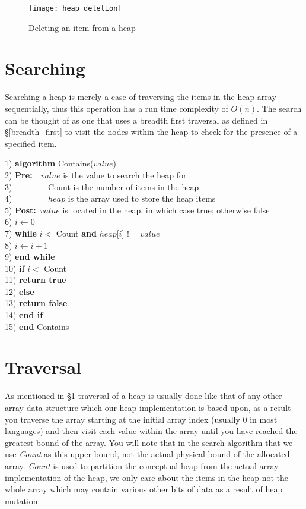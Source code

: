\begin{figure}
\begin{center}
\texttt{[image: heap\_deletion]}
\end{center}
\caption{Deleting an item from a heap} \label{fig:heap_deletion}
\end{figure}

\section{Searching} \label{heap_searching}
Searching a heap is merely a case of traversing the items in the heap array sequentially, thus this operation has a run time complexity of $O(n)$. The search can be thought of as one that uses a breadth first traversal as defined in \S\ref{breadth_first} to visit the nodes within the heap to check for the presence of a specified item.

\newpage
\begin{tabbing}
1)  \textbf{alg}\= \textbf{orithm} Contains($value$) \\
2)  \> \textbf{Pre:}~~$value$ is the value to search the heap for \\
3)  \> ~~~~~~~~Count is the number of items in the heap \\
4)  \> ~~~~~~~~$heap$ is the array used to store the heap items \\
5)  \> \textbf{Post:}~$value$ is located in the heap, in which case true; otherwise false \\
6)  \> $i \leftarrow 0$ \\
7)  \> \textbf{whi}\= \textbf{le} $i <$ Count \textbf{and} $heap$[$i$] $!= value$ \\
8)  \> \> $i \leftarrow i + 1$ \\
9)  \> \textbf{end while} \\
10) \> \textbf{if} $i <$ Count \\
11) \> \> \textbf{return true} \\
12) \> \textbf{else} \\
13) \> \> \textbf{return false} \\
14) \> \textbf{end if} \\
15) \textbf{end} Contains \\
\end{tabbing}

\section{Traversal}
As mentioned in \S\ref{heap_searching} traversal of a heap is usually done like that of any other array data structure which our heap implementation is based upon, as a result you traverse the array starting at the initial array index (usually $0$ in most languages) and then visit each value within the array until you have reached the greatest bound of the array. You will note that in the search algorithm that we use \textit{Count} as this upper bound, not the actual physical bound of the allocated array. \textit{Count} is used to partition the conceptual heap from the actual array implementation of the heap, we only care about the items in the heap not the whole array which may contain various other bits of data as a result of heap mutation.
